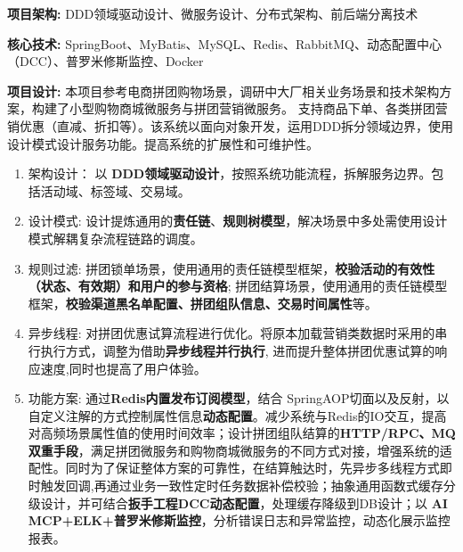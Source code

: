 \documentclass{resume}
\begin{document}
\begin{itemize}[parsep=0ex]
  {\small 
  \item \textbf{项目架构:} DDD领域驱动设计、微服务设计、分布式架构、前后端分离技术
  \vspace{0.1cm}
  \item \textbf{核心技术:} SpringBoot、MyBatis、MySQL、Redis、RabbitMQ、动态配置中心（DCC）、普罗米修斯监控、Docker
  \vspace{0.1cm}
  \item \textbf{项目设计:} 本项目参考电商拼团购物场景，调研中大厂相关业务场景和技术架构方案，构建了小型购物商城微服务与拼团营销微服务。 支持商品下单、各类拼团营销优惠（直减、折扣等）。该系统以面向对象开发，运用DDD拆分领域边界，使用设计模式设计服务功能。提高系统的扩展性和可维护性。
  \vspace{0.03cm}
 \begin{enumerate}[leftmargin = 0.3em, topsep=2pt, itemsep=0pt, parsep=0pt]
  \item 架构设计： 以 \textbf{DDD领域驱动设计}，按照系统功能流程，拆解服务边界。包括活动域、标签域、交易域。
  \vspace{0.07cm}
  \item 设计模式: 设计提炼通用的\textbf{责任链}、\textbf{规则树模型}，解决场景中多处需使用设计模式解耦复杂流程链路的调度。
  \vspace{0.07cm}
  \item 规则过滤: 拼团锁单场景，使用通用的责任链模型框架，\textbf{校验活动的有效性（状态、有效期）和用户的参与资格}; 拼团结算场景，使用通用的责任链模型框架，\textbf{校验渠道黑名单配置、拼团组队信息、交易时间属性}等。
  \vspace{0.07cm}
  \item 异步线程: 对拼团优惠试算流程进行优化。将原本加载营销类数据时采用的串行执行方式，调整为借助\textbf{异步线程并行执行}, 进而提升整体拼团优惠试算的响应速度,同时也提高了用户体验。
  \vspace{0.07cm}
  \item 功能方案: 通过\textbf{Redis内置发布订阅模型}，结合 SpringAOP切面以及反射，以自定义注解的方式控制属性信息\textbf{动态配置}。减少系统与Redis的IO交互，提高对高频场景属性值的使用时间效率；设计拼团组队结算的\textbf{HTTP/RPC、MQ 双重手段}，满足拼团微服务和购物商城微服务的不同方式对接，增强系统的适配性。同时为了保证整体方案的可靠性，在结算触达时，先异步多线程方式即时触发回调,再通过业务一致性定时任务数据补偿校验；抽象通用函数式缓存分级设计，并可结合\textbf{扳手工程DCC动态配置}，处理缓存降级到DB设计；以 \textbf{AI MCP+ELK+普罗米修斯监控}，分析错误日志和异常监控，动态化展示监控报表。
\end{enumerate}
}
\end{itemize}
\end{document}
